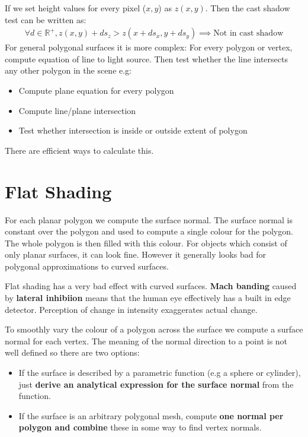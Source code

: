 \documentclass{article}
\begin{document}
If we set height values for every pixel ($x,y$) as $z(x,y)$.
Then the cast shadow test can be written as:
\begin{align*}
	\forall d \in \mathbb{R}^+, z(x,y) + ds_z > z(x+ds_x, y+ds_y) \implies \text{Not in cast shadow}
\end{align*}
For general polygonal surfaces it is more complex:
For every polygon or vertex, compute equation of line to light source.
Then test whether the line intersects any other polygon in the scene e.g:
\begin{itemize}
	\item Compute plane equation for every polygon
	\item Compute line/plane intersection
	\item Test whether intersection is inside or outside extent of polygon
\end{itemize}
There are efficient ways to calculate this.

\section{Flat Shading}
For each planar polygon we compute the surface normal.
The surface normal is constant over the polygon and used to compute a single colour for the polygon.
The whole polygon is then filled with this colour.
For objects which consist of only planar surfaces, it can look fine.
However it generally looks bad for polygonal approximations to curved surfaces.

Flat shading has a very bad effect with curved surfaces.
\textbf{Mach banding} caused by \textbf{lateral inhibiion} means that the human eye effectively has a built in edge detector.
Perception of change in intensity exaggerates actual change.

To smoothly vary the colour of a polygon across the surface we compute a surface normal for each vertex.
The meaning of the normal direction to a point is not well defined so there are two options:
\begin{itemize}
	\item If the surface is described by a parametric function (e.g a sphere or cylinder), just \textbf{derive an analytical expression for the surface normal} from the function.
	\item If the surface is an arbitrary polygonal mesh, compute \textbf{one normal per polygon and combine} these in some way to find vertex normals.
\end{itemize}
\end{document}
